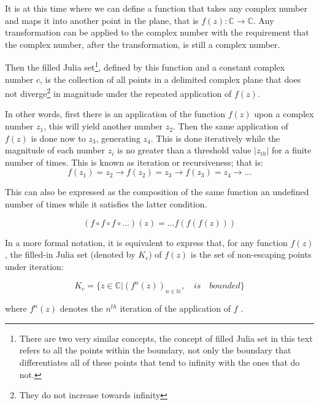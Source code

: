 \documentclass{article}
\begin{document}
It is at this time where we can define a function that takes any complex number and maps it into another point in the plane, that is $f(z):\mathbb{C}\rightarrow \mathbb{C}$. Any transformation can be applied to the complex number with the requirement that the complex number, after the transformation, is still a complex number.

Then the filled Julia set\footnote{There are two very similar concepts, the concept of filled Julia set in this text refers to all the points within the boundary,  not only the boundary that differentiates all of these points that tend to infinity with the ones that do not.}, defined by this function and a constant complex number $c$, is the collection of all points in a delimited complex plane that does not diverge\footnote{They do not increase towards infinity} in magnitude under the repeated application of $f(z)$\cite{csc}.

In other words, first there is an application of the function $f(z)$ upon a complex number $z_1$, this will yield another number $z_2$. Then the same application of $f(z)$ is done now to $z_3$, generating $z_4$. This is done iteratively while the magnitude of each number $z_i$ is no greater than a threshold value $|z_{th}|$ for a finite number of times\cite{coursera}. This is known as iteration or recursiveness; that is:
\begin{equation}
    f(z_1)=z_2 \longrightarrow f(z_2)=z_3 \longrightarrow f(z_3)=z_4 \longrightarrow \dots
\end{equation}

This can also be expressed as the composition of the same function an undefined number of times while it satisfies the latter condition.

\begin{equation}
    (f\circ f \circ f \circ \dots )(z) = \dots f(f(f(z)))
\end{equation}

In a more formal notation, it is equivalent to express that, for any function $f(z)$, the filled-in Julia set (denoted by $K_c$) of $f(z)$ is the set of non-escaping points under iteration:

\begin{equation}
    K_c = \{z \in \mathbb{C}| (f^n(z))_{n \in \mathbb{N}}, \quad is \quad bounded\}
\end{equation}

where $f^n(z)$ denotes the $n^{th}$ iteration of the application of $f$ \cite{Lei}.

\newpage
\end{document}
